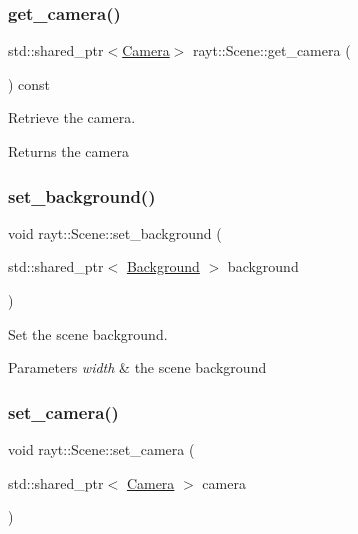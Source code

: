 \subsubsection{\texorpdfstring{get\_camera()}{get\_camera()}}
{\footnotesize\ttfamily std\+::shared\+\_\+ptr$<$\mbox{\hyperlink{class_camera}{Camera}}$>$ rayt\+::\+Scene\+::get\+\_\+camera (\begin{DoxyParamCaption}{ }\end{DoxyParamCaption}) const\hspace{0.3cm}{\ttfamily [inline]}}



Retrieve the camera. 

\begin{DoxyReturn}{Returns}
the camera 
\end{DoxyReturn}
\mbox{\label{classrayt_1_1_scene_a13012312e90ffd74e9b5ef34d7a19f17}} 
\subsubsection{\texorpdfstring{set\_background()}{set\_background()}}
{\footnotesize\ttfamily void rayt\+::\+Scene\+::set\+\_\+background (\begin{DoxyParamCaption}\item[{std\+::shared\+\_\+ptr$<$ \mbox{\hyperlink{classrayt_1_1_background}{Background}} $>$}]{background }\end{DoxyParamCaption})\hspace{0.3cm}{\ttfamily [inline]}}



Set the scene background. 


\begin{DoxyParams}{Parameters}
{\em width} & the scene background \\
\hline
\end{DoxyParams}
\mbox{\label{classrayt_1_1_scene_afde427e2d1e5d79942758a2ba91de66f}} 
\subsubsection{\texorpdfstring{set\_camera()}{set\_camera()}}
{\footnotesize\ttfamily void rayt\+::\+Scene\+::set\+\_\+camera (\begin{DoxyParamCaption}\item[{std\+::shared\+\_\+ptr$<$ \mbox{\hyperlink{class_camera}{Camera}} $>$}]{camera }\end{DoxyParamCaption})\hspace{0.3cm}{\ttfamily [inline]}}



